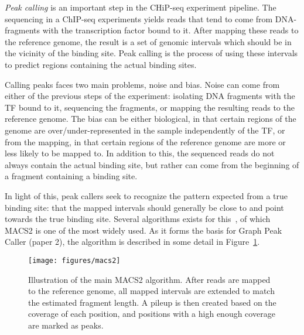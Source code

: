 \emph{Peak calling} is an important step in the CHiP-seq experiment pipeline.
The sequencing in a ChIP-seq experiments yields reads that tend to come from DNA-fragments with the transcription factor bound to it.
After mapping these reads to the reference genome, the result is a set of genomic intervals which should be in the vicinity of the binding site.
Peak calling is the process of using these intervals to predict regions containing the actual binding sites. 

Calling peaks faces two main problems, noise and bias.
Noise can come from either of the previous steps of the experiment: isolating DNA fragments with the TF bound to it, sequencing the fragments, or mapping the resulting reads to the reference genome.
The bias can be either biological, in that certain regions of the genome are over/under-represented in the sample independently of the TF, or from the mapping, in that certain regions of the reference genome are more or less likely to be mapped to.
In addition to this, the sequenced reads do not always contain the actual binding site, but rather can come from the beginning of a fragment containing a binding site. 

In light of this, peak callers seek to recognize the pattern expected from a true binding site: that the mapped intervals should generally be close to and point towards the true binding site.
Several algorithms exists for this~\cite{SPP, macs}, of which MACS2 is one of the most widely used.
As it forms the basis for Graph Peak Caller (paper 2), the algorithm is described in some detail in Figure~\ref{fig:macs}.

\begin{figure}
  \texttt{[image: figures/macs2]}
  \caption{
    Illustration of the main MACS2 algorithm.
    After reads are mapped to the reference genome, all mapped intervals are extended to match the estimated fragment length.
    A pileup is then created based on the coverage of each position, and positions with a high enough coverage are marked as peaks.}
  \label{fig:macs}
\end{figure}

% 
% 
% 
% 
% 
% 
% 
% 
% 
% 
% 
% 
% 
% 
% 
% 
% 
% 
% 
% 
% 
% 
% 
% 
% 
% 
% 
% 
% 
% 
% 
% 
% 
% 
% 
% 
% 
% 
% 
% 
% 
% 
% 
% 
% 
% 
% 
% 
% 
% 
% 
% 
% 
% 
% 
% 
% 
% 
% 
% 
% 
% 
% 
% 
% 
% 
% 
% 
% 
% 
% 
% 
% 
% 
% 
% 
% 
% 
% 
% 
% 
% 
% 
% 
% 
% 
% 
% 
% 
% 
% 
% 
% 
% 
% 
% 
% 
% 
% 
% 
% 
% 
% 
% 
% 
% 
% 
% 
% 
% 
